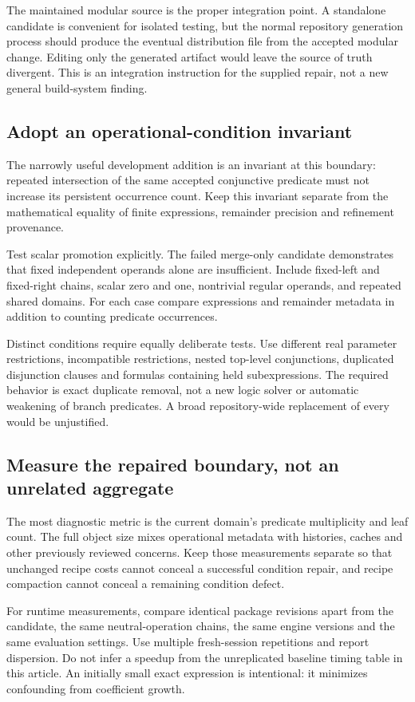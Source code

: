 \documentclass[11pt,a4paper]{article}
\newcommand{\code}[1]{\texttt{\detokenize{#1}}}
\begin{document}
The maintained modular source is the proper integration point. A standalone candidate is convenient for isolated testing, but the normal repository generation process should produce the eventual distribution file from the accepted modular change. Editing only the generated artifact would leave the source of truth divergent. This is an integration instruction for the supplied repair, not a new general build-system finding.

\subsection{Adopt an operational-condition invariant}
The narrowly useful development addition is an invariant at this boundary: repeated intersection of the same accepted conjunctive predicate must not increase its persistent occurrence count. Keep this invariant separate from the mathematical equality of finite expressions, remainder precision and refinement provenance.

Test scalar promotion explicitly. The failed merge-only candidate demonstrates that fixed independent operands alone are insufficient. Include fixed-left and fixed-right chains, scalar zero and one, nontrivial regular operands, and repeated shared domains. For each case compare expressions and remainder metadata in addition to counting predicate occurrences.

Distinct conditions require equally deliberate tests. Use different real parameter restrictions, incompatible restrictions, nested top-level conjunctions, duplicated disjunction clauses and formulas containing held subexpressions. The required behavior is exact duplicate removal, not a new logic solver or automatic weakening of branch predicates. A broad repository-wide replacement of every \code{And} would be unjustified.

\subsection{Measure the repaired boundary, not an unrelated aggregate}
The most diagnostic metric is the current domain's predicate multiplicity and leaf count. The full object size mixes operational metadata with histories, caches and other previously reviewed concerns. Keep those measurements separate so that unchanged recipe costs cannot conceal a successful condition repair, and recipe compaction cannot conceal a remaining condition defect.

For runtime measurements, compare identical package revisions apart from the candidate, the same neutral-operation chains, the same engine versions and the same evaluation settings. Use multiple fresh-session repetitions and report dispersion. Do not infer a speedup from the unreplicated baseline timing table in this article. An initially small exact expression is intentional: it minimizes confounding from coefficient growth.
\end{document}
